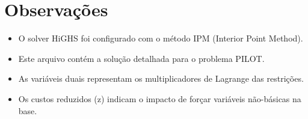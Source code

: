 \documentclass[12pt]{article}
\begin{document}
\begin{longtable}{@{}cc@{}}
\end{longtable}


\section{Observações}

\begin{itemize}
\item O solver HiGHS foi configurado com o método IPM (Interior Point Method).
\item Este arquivo contém a solução detalhada para o problema PILOT.
\item As variáveis duais representam os multiplicadores de Lagrange das restrições.
\item Os custos reduzidos (z) indicam o impacto de forçar variáveis não-básicas na base.
\end{itemize}
\end{document}
